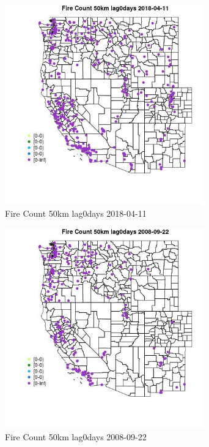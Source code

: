 \begin{figure} 
\centering  
\includegraphics[width=0.77\textwidth]{Code_Outputs/Report_ML_input_PM25_Step4_part_e_de_duplicated_aves_compiled_2019-05-18wNAs_MapObsFire_Count_50km_lag0days2018-04-11.jpg} 
\caption{\label{fig:Report_ML_input_PM25_Step4_part_e_de_duplicated_aves_compiled_2019-05-18wNAsMapObsFire_Count_50km_lag0days2018-04-11}Fire Count 50km lag0days 2018-04-11} 
\end{figure} 
 

\begin{figure} 
\centering  
\includegraphics[width=0.77\textwidth]{Code_Outputs/Report_ML_input_PM25_Step4_part_e_de_duplicated_aves_compiled_2019-05-18wNAs_MapObsFire_Count_50km_lag0days2008-09-22.jpg} 
\caption{\label{fig:Report_ML_input_PM25_Step4_part_e_de_duplicated_aves_compiled_2019-05-18wNAsMapObsFire_Count_50km_lag0days2008-09-22}Fire Count 50km lag0days 2008-09-22} 
\end{figure} 
 

